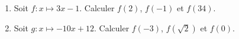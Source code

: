 
\begin{exercice}\label{exosmath-0514}

    \begin{enumerate}
        \item
            Soit \( f\colon x\mapsto 3x-1\). Calculer \( f(2)\), \( f(-1)\) et \( f(34)\).
        \item
            Soit \( g\colon x\mapsto -10x+12\). Calculer \( f(-3)\), \( f(\sqrt{2})\) et \( f(0)\).
    \end{enumerate}

\end{exercice}
